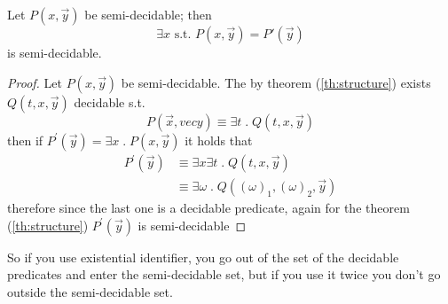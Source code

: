\begin{theorem}
  Let $ P(x,\vec{y}) $ be semi-decidable; then
  \[
    \exists x \mbox{ s.t. } P(x,\vec{y}) = P'(\vec{y})
  \]
  is semi-decidable.

  \begin{proof}
    Let $P(x,\vec{y})$ be semi-decidable. The by theorem
    (\ref{th:structure}) exists $Q(t,x,\vec{y})$ decidable s.t.
    \[
      P(\vec{x}, vec{y}) \equiv \exists t \; . \; Q(t,x,\vec{y})
    \]
    then if $P^\prime(\vec{y}) = \exists x \; . \; P(x, \vec{y})$ it
    holds that
    \[
      \begin{split}
        P^\prime(\vec{y}) &\equiv \exists x \exists t \; . \;
        Q(t,x,\vec{y}) \\
        &\equiv \exists \omega \; . \; Q((\omega)_1, (\omega)_2, \vec{y})
      \end{split}
    \]
    therefore since the last one is a decidable predicate, again for
    the theorem (\ref{th:structure}) $P^\prime(\vec{y})$ is
    semi-decidable
  \end{proof}
\end{theorem}

So if you use existential identifier, you go out of the set of the
decidable predicates and enter the semi-decidable set, but if you use
it twice you don't go outside the semi-decidable set.

